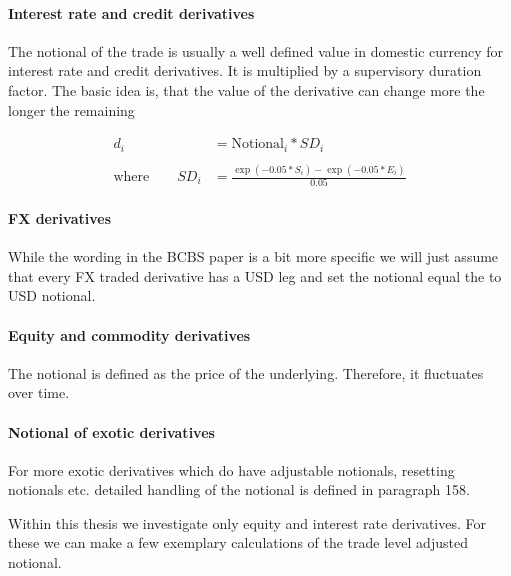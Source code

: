 \hypertarget{interest-rate-and-credit-derivatives}{%
\paragraph{Interest rate and credit
derivatives}\label{interest-rate-and-credit-derivatives}}

The notional of the trade is usually a well defined value in domestic
currency for interest rate and credit derivatives. It is multiplied by a
supervisory duration factor. The basic idea is, that the value of the
derivative can change more the longer the remaining

\begin{align*}
d_i &= \text{Notional}_i * SD_i \\
\\
\text{where} \qquad SD_i &=\frac{\exp\left(-0.05 * S_i\right)-\exp\left(-0.05 * E_i\right)}{0.05}
\end{align*}

\hypertarget{fx-derivatives}{%
\paragraph{FX derivatives}\label{fx-derivatives}}

While the wording in the BCBS paper is a bit more specific we will just
assume that every FX traded derivative has a USD leg and set the
notional equal the to USD notional.

\hypertarget{equity-and-commodity-derivatives}{%
\paragraph{Equity and commodity
derivatives}\label{equity-and-commodity-derivatives}}

The notional is defined as the price of the underlying. Therefore, it
fluctuates over time.

\hypertarget{notional-of-exotic-derivatives}{%
\paragraph{Notional of exotic
derivatives}\label{notional-of-exotic-derivatives}}

For more exotic derivatives which do have adjustable notionals,
resetting notionals etc. detailed handling of the notional is defined in
paragraph 158.

    Within this thesis we investigate only equity and interest rate
derivatives. For these we can make a few exemplary calculations of the
trade level adjusted notional.

